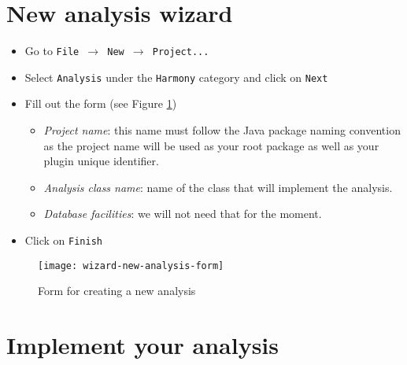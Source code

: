 %

\section{New analysis wizard}\label{newAnalysis:wizard}

	\begin{itemize}
		\item Go to \texttt{File $\rightarrow$ New $\rightarrow$ Project...}
		\item Select \texttt{Analysis} under the \texttt{Harmony} category and click on \texttt{Next} 
		\item Fill out the form (see Figure \ref{fig:wizard-new-analysis-form})
			\begin{itemize}
				\item \emph{Project name}: this name must follow the Java package naming convention as the project name will be used as your root package as well as your plugin unique identifier.
				\item \emph{Analysis class name}: name of the class that will implement the analysis.
				\item \emph{Database facilities}: we will not need that for the moment.
			\end{itemize}
		\item Click on \texttt{Finish}
	\end{itemize}

	\begin{figure}[H]
		\centering
		\texttt{[image: wizard-new-analysis-form]}
		\caption{Form for creating a new analysis}
		\label{fig:wizard-new-analysis-form}
	\end{figure}

\section{Implement your analysis}

